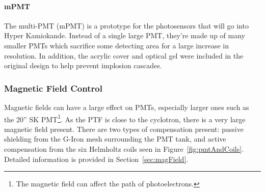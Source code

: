 \documentclass[twoside,letterpaper]{refart}
\begin{document}

\paragraph{mPMT}

The multi-PMT (mPMT) is a prototype for the photosensors that will go into Hyper Kamiokande. Instead of a single large PMT, they're made up of many smaller PMTs which sacrifice some detecting area for a large increase in resolution. In addition, the acrylic cover and optical gel were included in the original design to help prevent implosion cascades.

\clearpage
\subsubsection{Magnetic Field Control}

Magnetic fields can have a large effect on PMTs, especially larger ones such as the 20'' SK PMT\footnote{The magnetic field can affect the path of photoelectrons.}. As the PTF is close to the cyclotron, there is a very large magnetic field present. There are two types of compensation present: passive shielding from the G-Iron mesh surrounding the PMT tank, and active compensation from the six Helmholtz coils seen in Figure~\ref{fig:pmtAndCoils}. Detailed information is provided in Section~\ref{sec:magField}.


\end{document}
